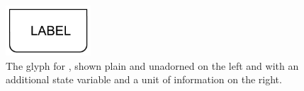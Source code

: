\begin{figure}[H]
  \centering
  \includegraphics[width = 1.25in]{images/genetic-plain} \hspace*{2em}
  \caption{The \PD glyph for , shown plain and
    unadorned on the left and with an additional state variable and a
    unit of information on the right.} 
  \label{fig:genetic}
\end{figure}

